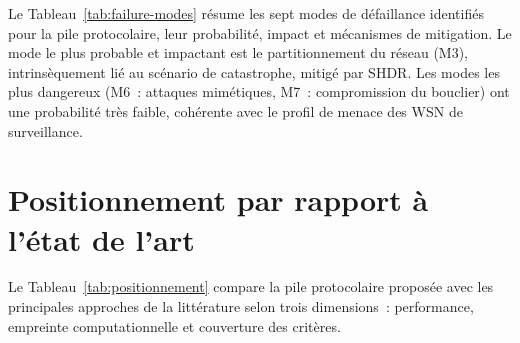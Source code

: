 Le Tableau~\ref{tab:failure-modes} résume les sept modes de défaillance identifiés pour la pile protocolaire, leur probabilité, impact et mécanismes de mitigation. Le mode le plus probable et impactant est le partitionnement du réseau (M3), intrinsèquement lié au scénario de catastrophe, mitigé par SHDR. Les modes les plus dangereux (M6~: attaques mimétiques, M7~: compromission du bouclier) ont une probabilité très faible, cohérente avec le profil de menace des WSN de surveillance.

\begin{table}[htbp]
\centering
\caption{Analyse des modes de défaillance de la pile protocolaire (FMEA simplifiée).}
\label{tab:failure-modes}
\end{table}


\section{Positionnement par rapport à l'état de l'art}\label{sec:disc-positionnement}

Le Tableau~\ref{tab:positionnement} compare la pile protocolaire proposée avec les principales approches de la littérature selon trois dimensions~: performance, empreinte computationnelle et couverture des critères.

